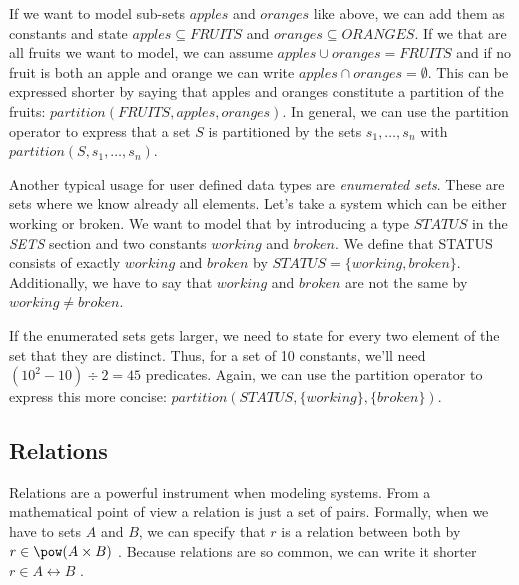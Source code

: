 
If we want to model sub-sets $apples$ and $oranges$ like above, we can add them as
constants and state $apples \subseteq FRUITS$ and $oranges \subseteq ORANGES$.
If we that are all fruits we want to model, we can assume $apples \cup oranges = FRUITS$
and if no fruit is both an apple and orange we can write $apples \cap oranges = \emptyset$.
This can be expressed shorter by saying that apples and oranges constitute a
partition of the fruits: $partition(FRUITS,apples,oranges)$.
In general, we can use the partition operator to express that a set $S$ is partitioned by the
sets $s_1,\ldots,s_n$ with $partition(S,s_1,\ldots,s_n)$.

Another typical usage for user defined data types are \emph{enumerated sets}.
These are sets where we know already all elements. Let's take a system which can be either working or broken.
We want to model that by introducing a type $STATUS$ in the \textsl{SETS} section and two constants
$working$ and $broken$.
We define that STATUS consists of exactly $working$ and $broken$ by $STATUS = \{working,broken\}$.
Additionally, we have to say that $working$ and $broken$ are not the same by $working \neq broken$.

If the enumerated sets gets larger, we need to state for every two element of the set that they are
distinct. Thus, for a set of 10 constants, we'll need $(10^2-10)\div 2 = 45$ predicates.
Again, we can use the partition operator to express this more concise: $partition(STATUS,\{working\},\{broken\})$.

\subsection{Relations}
\label{tut:relations}
Relations are a powerful instrument when modeling systems. From a mathematical point of view a
relation is just a set of pairs. Formally, when we have to sets $A$ and $B$, we can specify that
$r$ is a relation between both by $r \in \pow(A\cprod B)$ .
Because relations are so common, we can write it shorter $r \in A\rel B$ .

